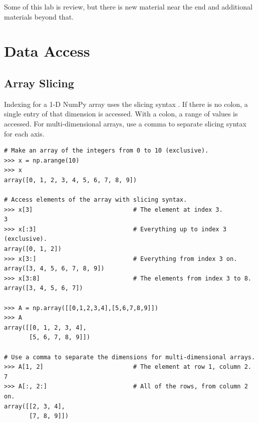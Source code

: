 \label{lab:NumPy}

\begin{info}
Some of this lab is review, but there is new material near the end and additional materials beyond that.
\end{info}

\section*{Data Access} %

\subsection*{Array Slicing} %

Indexing for a 1-D NumPy array uses the slicing syntax .
If there is no colon, a single entry of that dimension is accessed.
With a colon, a range of values is accessed.
For multi-dimensional arrays, use a comma to separate slicing syntax for each axis.

\begin{lstlisting}
# Make an array of the integers from 0 to 10 (exclusive).
>>> x = np.arange(10)
>>> x
array([0, 1, 2, 3, 4, 5, 6, 7, 8, 9])

# Access elements of the array with slicing syntax.
>>> x[3]                            # The element at index 3.
3
>>> x[:3]                           # Everything up to index 3 (exclusive).
array([0, 1, 2])
>>> x[3:]                           # Everything from index 3 on.
array([3, 4, 5, 6, 7, 8, 9])
>>> x[3:8]                          # The elements from index 3 to 8.
array([3, 4, 5, 6, 7])

>>> A = np.array([[0,1,2,3,4],[5,6,7,8,9]])
>>> A
array([[0, 1, 2, 3, 4],
       [5, 6, 7, 8, 9]])

# Use a comma to separate the dimensions for multi-dimensional arrays.
>>> A[1, 2]                         # The element at row 1, column 2.
7
>>> A[:, 2:]                        # All of the rows, from column 2 on.
array([[2, 3, 4],
       [7, 8, 9]])
\end{lstlisting}

